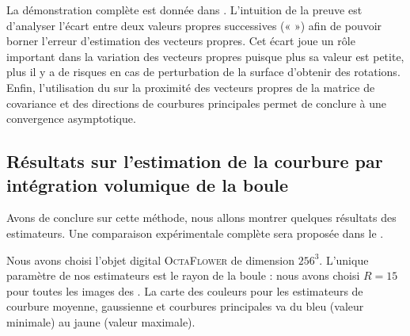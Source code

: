 La démonstration complète est donnée dans \cite{ChapterIICurvature}. L'intuition
de la preuve est d'analyser l'écart entre deux valeurs propres successives («
 ») afin de pouvoir borner l'erreur d'estimation
des vecteurs propres. Cet écart joue un rôle important dans la variation des
vecteurs propres puisque plus sa valeur est petite, plus il y a de risques en
cas de perturbation de la surface d'obtenir des rotations. Enfin, l'utilisation
du  sur la proximité des vecteurs propres de la
matrice de covariance et des directions de courbures principales permet de
conclure à une convergence asymptotique.
%
\subsection{Résultats sur l'estimation de la courbure par intégration volumique de la boule}
%
Avons de conclure sur cette méthode, nous allons montrer quelques résultats des
estimateurs. Une comparaison expérimentale complète sera proposée dans le
.


Nous avons choisi l'objet digital \textsc{OctaFlower} de dimension $256^3$.
L'unique paramètre de nos estimateurs est le rayon de la boule : nous avons
choisi $R=15$ pour toutes les images des
. La carte des couleurs
pour les estimateurs de courbure moyenne, gaussienne et courbures principales va
du bleu (valeur minimale) au jaune (valeur maximale).

